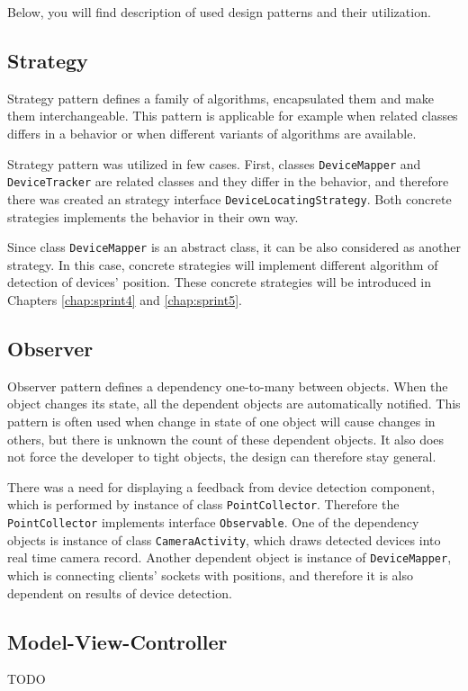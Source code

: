 Below, you will find description of used design patterns and their utilization.

\subsection{Strategy}
Strategy pattern defines a family of algorithms, encapsulated them and make them interchangeable\cite[p.~349]{Gamma:1995:DPE:186897}.
This pattern is applicable for example when related classes differs in a behavior or when different variants of algorithms are available.

Strategy pattern was utilized in few cases.
First, classes \texttt{DeviceMapper} and \texttt{DeviceTracker} are related classes and they differ in the behavior, and therefore there was created an strategy interface \texttt{DeviceLocatingStrategy}.
Both concrete strategies implements the behavior in their own way.

Since class \texttt{DeviceMapper} is an abstract class, it can be also considered as another strategy.
In this case, concrete strategies will implement different algorithm of detection of devices' position.
These concrete strategies will be introduced in Chapters \ref{chap:sprint4} and \ref{chap:sprint5}.

\subsection{Observer}
Observer pattern defines a dependency one-to-many between objects.
When the object changes its state, all the dependent objects are automatically notified.
This pattern is often used when change in state of one object will cause changes in others, but there is unknown the count of these dependent objects.
It also does not force the developer to tight objects, the design can therefore stay general. \cite[p.~327]{Gamma:1995:DPE:186897}

There was a need for displaying a feedback from device detection component, which is performed by instance of class \texttt{PointCollector}.
Therefore the \texttt{PointCollector} implements interface \texttt{Observable}.
One of the dependency objects is instance of class \texttt{CameraActivity}, which draws detected devices into real time camera record.
Another dependent object is instance of \texttt{DeviceMapper}, which is connecting clients' sockets with positions, and therefore it is also dependent on results of device detection.

\subsection{Model-View-Controller}
TODO
